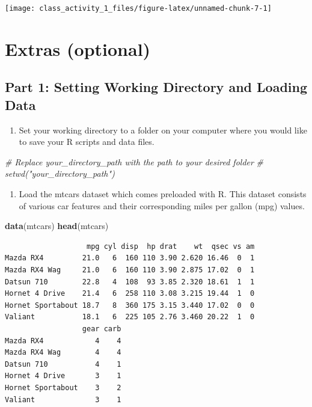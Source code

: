 \documentclass[
]{book}
\newenvironment{Shaded}{\begin{snugshade}}{\end{snugshade}}
\newcommand{\CommentTok}[1]{\textcolor[rgb]{0.56,0.35,0.01}{\textit{#1}}}
\newcommand{\FunctionTok}[1]{\textcolor[rgb]{0.13,0.29,0.53}{\textbf{#1}}}
\newcommand{\NormalTok}[1]{#1}
\providecommand{\tightlist}{%
  \setlength{\itemsep}{0pt}\setlength{\parskip}{0pt}}
\begin{document}
\texttt{[image: class\_activity\_1\_files/figure-latex/unnamed-chunk-7-1]}

\hypertarget{extras-optional}{%
\section{Extras (optional)}\label{extras-optional}}

\hypertarget{part-1-setting-working-directory-and-loading-data}{%
\subsection{Part 1: Setting Working Directory and Loading Data}\label{part-1-setting-working-directory-and-loading-data}}

\begin{enumerate}
\def\labelenumi{\arabic{enumi}.}
\tightlist
\item
  Set your working directory to a folder on your computer where you would like to save your R scripts and data files.
\end{enumerate}

\begin{Shaded}
\begin{Highlighting}[]
\CommentTok{\# Replace \textquotesingle{}your\_directory\_path\textquotesingle{} with the path to your desired folder}
\CommentTok{\# setwd("your\_directory\_path")}
\end{Highlighting}
\end{Shaded}

\begin{enumerate}
\def\labelenumi{\arabic{enumi}.}
\setcounter{enumi}{1}
\tightlist
\item
  Load the mtcars dataset which comes preloaded with R. This dataset consists of various car features and their corresponding miles per gallon (mpg) values.
\end{enumerate}

\begin{Shaded}
\begin{Highlighting}[]
\FunctionTok{data}\NormalTok{(mtcars)}
\FunctionTok{head}\NormalTok{(mtcars)}
\end{Highlighting}
\end{Shaded}

\begin{verbatim}
                   mpg cyl disp  hp drat    wt  qsec vs am
Mazda RX4         21.0   6  160 110 3.90 2.620 16.46  0  1
Mazda RX4 Wag     21.0   6  160 110 3.90 2.875 17.02  0  1
Datsun 710        22.8   4  108  93 3.85 2.320 18.61  1  1
Hornet 4 Drive    21.4   6  258 110 3.08 3.215 19.44  1  0
Hornet Sportabout 18.7   8  360 175 3.15 3.440 17.02  0  0
Valiant           18.1   6  225 105 2.76 3.460 20.22  1  0
                  gear carb
Mazda RX4            4    4
Mazda RX4 Wag        4    4
Datsun 710           4    1
Hornet 4 Drive       3    1
Hornet Sportabout    3    2
Valiant              3    1
\end{verbatim}
\end{document}

